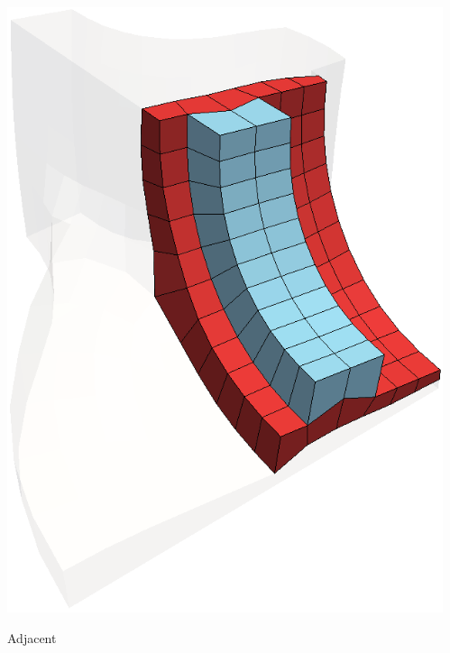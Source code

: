 \documentclass[12pt]{beamer}
\begin{document}
\begin{frame}
\begin{columns}
\begin{column}{0.3\textwidth}
      \includegraphics[width=\textwidth]{./images/sheet-adjacent.png}
      \begin{center}Adjacent\end{center}
    \end{column}
    \begin{column}{0.3\textwidth}

\end{column}
\end{columns}
\end{frame}
\end{document}
